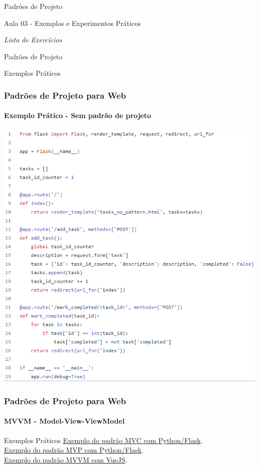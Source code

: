 \documentclass[
	9pt, %
	t, %
]{beamer}
\newcommand{\iconLink}[2]{\href{#1}{\faLink \hspace{0.2em} {#2}}}
\begin{document}

\begin{frame}
	\begin{center}
		
		\bigskip\bigskip\bigskip\bigskip %
		{\Large Padrões de Projeto}
		
		\bigskip\bigskip %
		{\Huge Aula 03 - Exemplos e Experimentos Práticos}
		
		\smallskip
		{\small \textit{Lista de Exercícios}}
	\end{center}

\end{frame}


\begin{frame}
	\begin{center}
		
		\bigskip\bigskip\bigskip\bigskip %
		{\Large Padrões de Projeto}
		
		\bigskip\bigskip %
		{\Huge Exemplos Práticos}
	\end{center}

\end{frame}

\begin{frame}
	\frametitle{Padrões de Projeto para Web}
	\framesubtitle{Exemplo Prático - Sem padrão	de projeto}

	\includegraphics[width=0.6\linewidth]{Images/no_pattern.png}

\end{frame}

\begin{frame}
	\frametitle{Padrões de Projeto para Web}
	\framesubtitle{MVVM - Model-View-ViewModel}

	\begin{block}{Exemplos Práticos}
		\iconLink{https://gist.github.com/fabricioifc/d1bde9f4a13cf63b49870be4bc87a72f}{Exemplo do padrão MVC com Python/Flask}.\\
		\iconLink{https://gist.github.com/fabricioifc/663f8abcba307a013bb56d214752458b}{Exemplo do padrão MVP com Python/Flask}.\\
		\iconLink{https://codepen.io/fabriciobizotto/pen/MWxeONo}{Exemplo do padrão MVVM com VueJS}.
	\end{block}
\end{frame}
\end{document}

